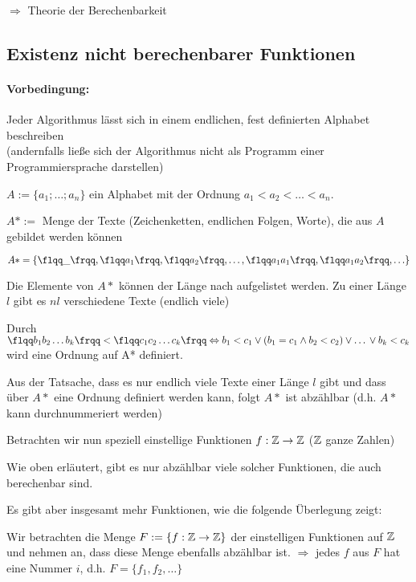 $\Rightarrow$ Theorie der Berechenbarkeit

\subsection{Existenz nicht berechenbarer Funktionen}
\paragraph{Vorbedingung:}
Jeder Algorithmus lässt sich in einem endlichen, fest definierten Alphabet beschreiben\\
(andernfalls ließe sich der Algorithmus nicht als Programm einer Programmiersprache darstellen)

\begin{compactitem}
	\item $A := \{a_1; \ldots ; a_n\}$ ein Alphabet mit der Ordnung $a_1 < a_2 < \ldots < a_n$.
	\item $A* :=$ Menge der Texte (Zeichenketten, endlichen Folgen, Worte), die aus $A$ gebildet werden können
	\item $A* = \{{\flqq\_\frqq}, {\flqq a_1\frqq}, {\flqq a_2\frqq}, \ldots, {\flqq a_1a_1\frqq}, {\flqq a_1a_2\frqq}, \ldots\}$
	\item Die Elemente von $A*$ können der Länge nach aufgelistet werden. Zu einer Länge $l$ gibt es $nl$ verschiedene Texte (endlich viele)
	\item Durch ${\flqq b_1b_2\ldots b_k\frqq} < {\flqq c_1c_2\ldots c_k\frqq}\\
	\Leftrightarrow b_1 < c_1\\
	\lor (b_1 = c_1 \land b_2 < c_2)\\
	\lor \ldots\\
	\lor b_k < c_k$\\
	wird eine Ordnung auf A* definiert.
	\item Aus der Tatsache, dass es nur endlich viele Texte einer Länge $l$ gibt und dass über $A*$ eine Ordnung definiert werden kann, folgt $A*$ ist abzählbar (d.h. $A*$ kann durchnummeriert werden)
	\item Betrachten wir nun speziell einstellige Funktionen $f : \mathbb{Z} \to \mathbb{Z}$ ($\mathbb{Z}$ ganze Zahlen)
	\item Wie oben erläutert, gibt es nur abzählbar viele solcher Funktionen, die auch berechenbar sind.
	\item Es gibt aber insgesamt mehr Funktionen, wie die folgende Überlegung zeigt:
	\begin{compactitem}
		\item Wir betrachten die Menge $F := \{ f : \mathbb{Z} \to \mathbb{Z} \}$ der einstelligen Funktionen auf $\mathbb{Z}$ und nehmen an, dass diese Menge ebenfalls abzählbar ist. $\Rightarrow$ jedes $f$ aus $F$ hat eine Nummer $i$, d.h. $F= \{f_1, f_2, \ldots \}$

\end{compactitem}
\end{compactitem}

